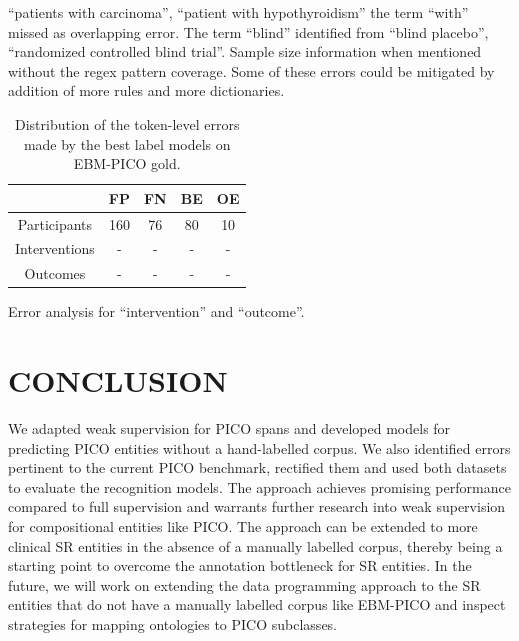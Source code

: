 \documentclass[10.7pt,]{article}
\begin{document}
``patients with carcinoma'', ``patient with hypothyroidism'' the term ``with'' missed as overlapping error.
The term ``blind'' identified from ``blind placebo'', ``randomized controlled blind trial''.
Sample size information when mentioned without the regex pattern coverage.
Some of these errors could be mitigated by addition of more rules and more dictionaries.
%
\begin{table}[h!]
\begin{center}
\begin{tabular}{| c | c | c | c | c |} 
\hline
 & FP & FN & BE & OE \\ 
\hline
Participants & 160 & 76 & 80 & 10 \\ 
Interventions & - & - & - & - \\ 
Outcomes & - & - & - & - \\ 
\hline
\end{tabular}
\caption{\label{tab:error_ner} Distribution of the token-level errors made by the best label models on EBM-PICO gold.}
\end{center}
\end{table}
%


Error analysis for ``intervention'' and ``outcome''.
%
%
%
\section{CONCLUSION}\label{conclusion}
%
We adapted weak supervision for PICO spans and developed models for predicting PICO entities without a hand-labelled corpus.
We also identified errors pertinent to the current PICO benchmark, rectified them and used both datasets to evaluate the recognition models.
The approach achieves promising performance compared to full supervision and warrants further research into weak supervision for compositional entities like PICO.
The approach can be extended to more clinical SR entities in the absence of a manually labelled corpus, thereby being a starting point to overcome the annotation bottleneck for SR entities.
In the future, we will work on extending the data programming approach to the SR entities that do not have a manually labelled corpus like EBM-PICO and inspect strategies for mapping ontologies to PICO subclasses.
%
%
%
\end{document}
